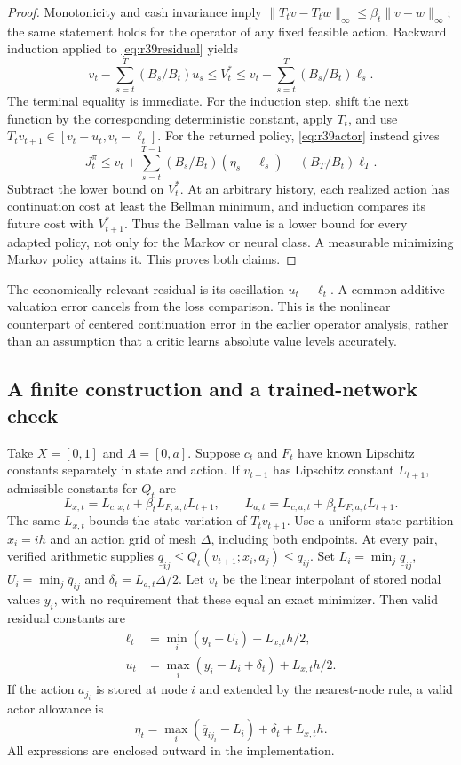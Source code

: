 \begin{proof}
Monotonicity and cash invariance imply
$\|T_tv-T_tw\|_\infty\leq\beta_t\|v-w\|_\infty$; the same statement holds
for the operator of any fixed feasible action. Backward induction applied to
\eqref{eq:r39residual} yields
\[
 v_t-\sum_{s=t}^T(B_s/B_t)u_s\leq V_t^*
 \leq v_t-\sum_{s=t}^T(B_s/B_t)\ell_s.
\]
The terminal equality is immediate. For the induction step, shift the next
function by the corresponding deterministic constant, apply $T_t$, and use
$T_tv_{t+1}\in[v_t-u_t,v_t-\ell_t]$.
For the returned policy, \eqref{eq:r39actor} instead gives
\[
 J_t^\pi\leq v_t+\sum_{s=t}^{T-1}(B_s/B_t)(\eta_s-\ell_s)
                    -(B_T/B_t)\ell_T.
\]
Subtract the lower bound on $V_t^*$. At an arbitrary history, each realized
action has continuation cost at least the Bellman minimum, and induction
compares its future cost with $V_{t+1}^*$. Thus the Bellman value is a lower
bound for every adapted policy, not only for the Markov or neural class.
A measurable minimizing Markov policy attains it. This proves both claims.
\end{proof}

The economically relevant residual is its oscillation $u_t-\ell_t$.
A common additive valuation error cancels from the loss comparison. This is
the nonlinear counterpart of centered continuation error in the earlier
operator analysis, rather than an assumption that a critic learns absolute
value levels accurately.

\subsection{A finite construction and a trained-network check}
Take $X=[0,1]$ and $A=[0,\bar a]$. Suppose $c_t$ and $F_t$ have known
Lipschitz constants separately in state and action. If $v_{t+1}$ has
Lipschitz constant $L_{t+1}$, admissible constants for $Q_t$ are
\begin{equation}\label{eq:r39lipschitz}
 L_{x,t}=L_{c,x,t}+\beta_t L_{F,x,t}L_{t+1},\qquad
 L_{a,t}=L_{c,a,t}+\beta_t L_{F,a,t}L_{t+1}.
\end{equation}
The same $L_{x,t}$ bounds the state variation of $T_tv_{t+1}$.
Use a uniform state partition $x_i=ih$ and an action grid of mesh $\Delta$,
including both endpoints. At every pair, verified arithmetic supplies
$\underline q_{ij}\leq Q_t(v_{t+1};x_i,a_j)\leq\overline q_{ij}$.
Set $L_i=\min_j\underline q_{ij}$, $U_i=\min_j\overline q_{ij}$ and
$\delta_t=L_{a,t}\Delta/2$. Let $v_t$ be the linear interpolant of stored
nodal values $y_i$, with no requirement that these equal an exact minimizer.
Then valid residual constants are
\begin{align}\label{eq:r39mesh}
 \ell_t&=\min_i(y_i-U_i)-L_{x,t}h/2,\\
 u_t&=\max_i(y_i-L_i+\delta_t)+L_{x,t}h/2.\nonumber
\end{align}
If the action $a_{j_i}$ is stored at node $i$ and extended by the
nearest-node rule, a valid actor allowance is
\begin{equation}\label{eq:r39meshactor}
 \eta_t=\max_i(\overline q_{i j_i}-L_i)+\delta_t+L_{x,t}h.
\end{equation}
All expressions are enclosed outward in the implementation.

